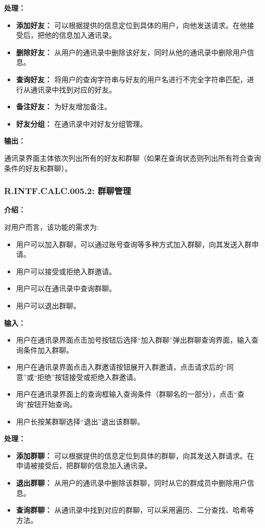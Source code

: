 \textbf{处理：}

\begin{itemize}
  \item \textbf{添加好友：} 可以根据提供的信息定位到具体的用户，向他发送请求。在他接受后，把他的信息加入通讯录。
  \item \textbf{删除好友：} 从用户的通讯录中删除该好友，同时从他的通讯录中删除用户信息。
  \item \textbf{查询好友：} 将用户的查询字符串与好友的用户名进行不完全字符串匹配，进行从通讯录中找到对应的好友。
  \item \textbf{备注好友：} 为好友增加备注。
  \item \textbf{好友分组：} 在通讯录中对好友分组管理。
\end{itemize}

\textbf{输出：}

通讯录界面主体依次列出所有的好友和群聊（如果在查询状态则列出所有符合查询条件的好友和群聊）。

\subsubsection{R.INTF.CALC.005.2: 群聊管理}

\textbf{介绍：}

对用户而言，该功能的需求为:
\begin{itemize}
  \item 用户可以加入群聊，可以通过账号查询等多种方式加入群聊，向其发送入群申请。
  \item 用户可以接受或拒绝入群邀请。
  \item 用户可以在通讯录中查询群聊。
  \item 用户可以退出群聊。
\end{itemize}

\textbf{输入：}

\begin{itemize}
  \item 用户在通讯录界面点击加号按钮后选择“加入群聊”弹出群聊查询界面，输入查询条件加入群聊。
  \item 用户在通讯录界面点击入群邀请按钮展开入群邀请，点击请求后的“同意”或“拒绝”按钮接受或拒绝入群邀请。
  \item 用户在通讯录界面上的查询框输入查询条件（群聊名的一部分），点击“查询”按钮开始查询。
  \item 用户长按某群聊选择“退出”退出该群聊。
\end{itemize}

\textbf{处理：}

\begin{itemize}
  \item \textbf{添加群聊：} 可以根据提供的信息定位到具体的群聊，向其发送入群请求。在申请被接受后，把群聊的信息加入通讯录。
  \item \textbf{退出群聊：} 从用户的通讯录中删除该群聊，同时从它的群成员中删除用户信息。
  \item \textbf{查询群聊：} 从通讯录中找到对应的群聊，可以采用遍历、二分查找、哈希等方法。
\end{itemize}


